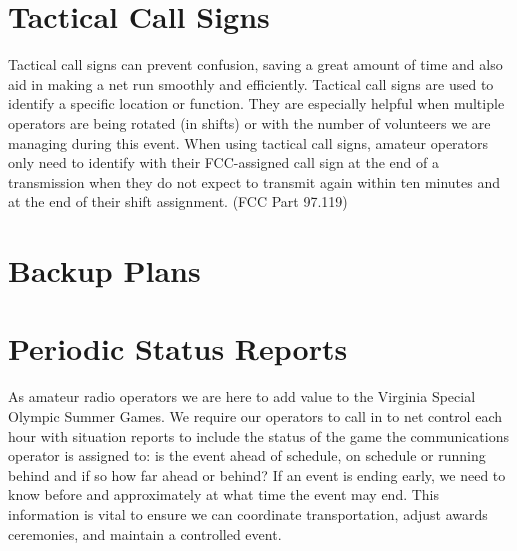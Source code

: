 \documentclass[pdflatex,letterpaper,twoside,12pt]{book}
\begin{document}

\section{Tactical Call Signs}

Tactical call signs can prevent confusion, saving a great amount of time and also aid in making a net run smoothly and efficiently.  Tactical call signs are used to identify a specific location or function.  They are especially helpful when multiple operators are being rotated (in shifts) or with the number of volunteers we are managing during this event.  When using tactical call signs, amateur operators only need to identify with their FCC-assigned call sign at the end of a transmission when they do not expect to transmit again within ten minutes and at the end of their shift assignment. (FCC Part 97.119) 



\section{Backup Plans}


\section{Periodic Status Reports}

As amateur radio operators we are here to add value to the Virginia Special Olympic Summer Games.  We require our operators to call in to net control each hour with situation reports to include the status of the game the communications operator is assigned to: is the event ahead of schedule, on schedule or running behind and if so how far ahead or behind?  If an event is ending early, we need to know before and approximately at what time the event may end.  This information is vital to ensure we can coordinate transportation, adjust awards ceremonies, and maintain a controlled event.
\end{document}
